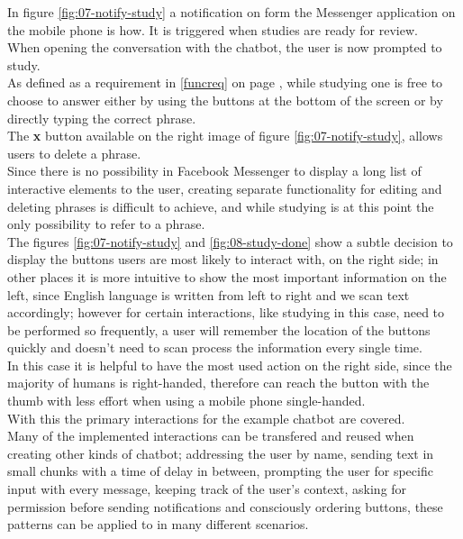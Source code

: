In figure \ref{fig:07-notify-study} a notification on form the Messenger application on the mobile phone is how.
It is triggered when studies are ready for review.
\\
When opening the conversation with the chatbot,
the user is now prompted to study.
\\
As defined as a requirement in \ref{funcreq} on page \pageref{funcreq},
while studying one is free to choose to answer either by using the buttons at the bottom of the screen
or by directly typing the correct phrase.
\\

The \textbf{x} button available on the right image of figure \ref{fig:07-notify-study},
allows users to delete a phrase.
\\
Since there is no possibility in Facebook Messenger to display a long list of interactive elements to the user,
creating separate functionality for editing and deleting phrases is difficult to achieve,
and while studying is at this point the only possibility to refer to a phrase.
\\

The figures \ref{fig:07-notify-study} and \ref{fig:08-study-done} show a subtle decision to display the buttons users are most likely to interact with,
on the right side;
in other places it is more intuitive to show the most important information on the left,
since English language is written from left to right and we scan text accordingly;
however for certain interactions, like studying in this case, need to be performed so frequently,
a user will remember the location of the buttons quickly and doesn't need to scan process the information every single time.
\\
In this case it is helpful to have the most used action on the right side, since the majority of humans is right-handed,
therefore can reach the button with the thumb with less effort when using a mobile phone single-handed.
\\


With this the primary interactions for the example chatbot are covered.
\\
Many of the implemented interactions can be transfered and reused when creating other kinds of chatbot;
addressing the user by name,
sending text in small chunks with a time of delay in between,
prompting the user for specific input with every message,
keeping track of the user's context,
asking for permission before sending notifications and
consciously ordering buttons,
these patterns can be applied to in many different scenarios.


